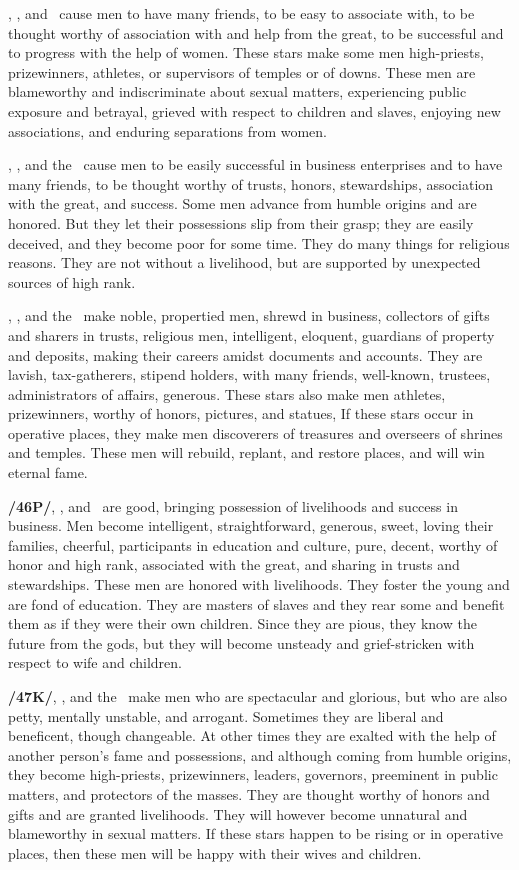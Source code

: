 \Jupiter, \Mars, and \Venus\, cause men to have many friends, to be easy to associate with, to be thought worthy of association with and help from the great, to be successful and to progress with the help of women. These stars make some men high-priests, prizewinners, athletes, or supervisors of temples or of downs. These men are blameworthy and indiscriminate about sexual matters, experiencing public exposure and betrayal, grieved with respect to children and slaves, enjoying new associations, and enduring separations from women.

\Jupiter, \Mercury, and the \Sun\, cause men to be easily successful in business enterprises and to have many friends, to be thought worthy of trusts, honors, stewardships, association with the great, and success. Some men advance from humble origins and are honored. But they let their possessions slip from their grasp; they are easily deceived, and they become poor for some time. They do many things for religious
reasons. They are not without a livelihood, but are supported by unexpected sources of high rank.

\Jupiter, \Mercury, and the \Moon\, make noble, propertied men, shrewd in business, collectors of gifts
and sharers in trusts, religious men, intelligent, eloquent, guardians of property and deposits, making their careers amidst documents and accounts. They are lavish, tax-gatherers, stipend holders, with many friends, well-known, trustees, administrators of affairs, generous. These stars also make men athletes, prizewinners, worthy of honors, pictures, and statues, If these stars occur in operative places, they make men discoverers of treasures and overseers of shrines and temples. These men will rebuild, replant, and restore places, and will win eternal fame.

\textbf{/46P/}\Jupiter, \Mercury, and \Venus\, are good, bringing possession of livelihoods and success in business. Men become intelligent, straightforward, generous, sweet, loving their families, cheerful, participants in education and culture, pure, decent, worthy of honor and high rank, associated with the great, and sharing in trusts and stewardships. These men are honored with livelihoods. They foster the young and are fond of education. They are masters of slaves and they rear some and benefit them as if they
were their own children. Since they are pious, they know the future from the gods, but they will become unsteady and grief-stricken with respect to wife and children.

\textbf{/47K/}\Jupiter, \Venus, and the \Sun\, make men who are spectacular and glorious, but who are also petty,
mentally unstable, and arrogant. Sometimes they are liberal and beneficent, though changeable. At other times they are exalted with the help of another person’s fame and possessions, and although coming from humble origins, they become high-priests, prizewinners, leaders, governors, preeminent in public matters, and protectors of the masses. They are thought worthy of honors and gifts and are granted livelihoods. They will however become unnatural and blameworthy in sexual matters. If these stars happen to be rising or in operative places, then these men will be happy with their wives and children.

